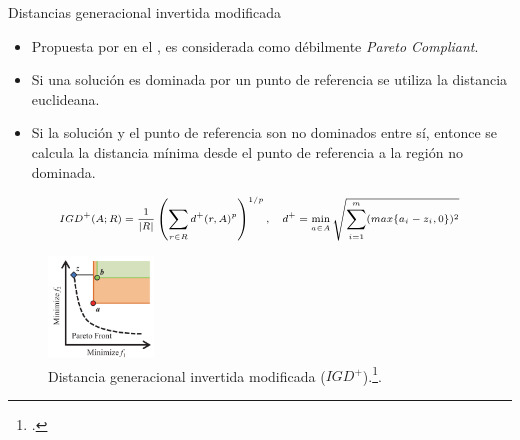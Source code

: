 \documentclass{beamer}
\begin{document}
\begin{frame}{Distancias generacional invertida modificada}
\begin{itemize}
\justifying
\scriptsize
\item Propuesta por \citeauthor{Joel:IGDPlus_And_GDPlus} en el \citeyear{Joel:IGDPlus_And_GDPlus}, es considerada como débilmente \textit{Pareto Compliant}.
\item Si una solución es dominada por un punto de referencia se utiliza la distancia euclideana.
\item Si la solución y el punto de referencia son no dominados entre sí, entonce se calcula la distancia mínima desde el punto de referencia a la región no dominada.
\end{itemize}
\begin{equation*}
\scriptsize
\begin{split}
IGD^+(A; R) = \frac{1}{|R|} \left (   \sum_{r \in R} d^+(r, A)^p \right)^{1/p}, \quad d^+ = \min_{a \in A} \sqrt{\sum_{i=1}^m (max\{ a_i - z_i, 0\})^2}
\end{split}
\end{equation*}


\begin{figure}[H]
\centering
\includegraphics[width=0.25\textwidth]{Images/igd_3.png}
\caption{\scriptsize Distancia generacional invertida modificada ($IGD^+$).\footcite{ishibuchi2016sensitivity}.}
\end{figure}
\end{frame}
\end{document}
